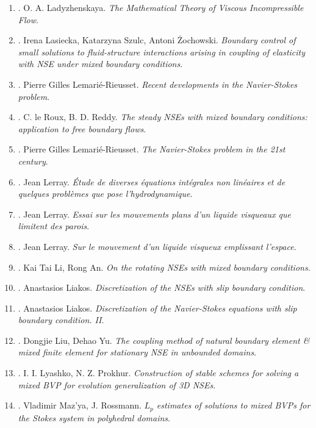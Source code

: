 \documentclass{article}
\begin{document}
\begin{enumerate}
	\item \cite{Ladyzhenskaya1969}. {\sc O. A. Ladyzhenskaya}. {\it The Mathematical Theory of Viscous Incompressible Flow}.
	\item \cite{Lasiecka_Szulc_Zochowski2018}. {\sc Irena Lasiecka, Katarzyna Szulc, Antoni \.{Z}ochowski}. {\it Boundary control of small solutions to fluid-structure interactions arising in coupling of elasticity with NSE under mixed boundary conditions}.
	\item \cite{Lemarie-Rieusset2002}. {\sc Pierre Gilles Lemari\'{e}-Rieusset}. {\it Recent developments in the Navier-Stokes problem}.
	\item \cite{le-Roux_Reddy1993}. {\sc C. le Roux, B. D. Reddy}. {\it The steady NSEs with mixed boundary conditions: application to free boundary flows}.
	\item \cite{Lemarie-Rieusset2016}. {\sc Pierre Gilles Lemari\'{e}-Rieusset}. {\it The Navier-Stokes problem in the 21st century}.
	\item \cite{Leray1933}. {\sc Jean Lerray}. {\it \'{E}tude de diverses \'{e}quations int\'{e}grales non lin\'{e}aires et de quelques probl\`emes que pose l'hydrodynamique}.
	\item \cite{Leray1934a}. {\sc Jean Lerray}. {\it Essai sur les mouvements plans d'un liquide visqueaux que limitent des parois}.
	\item \cite{Leray1934b}. {\sc Jean Lerray}. {\it Sur le mouvement d'un liquide visqueux emplissant l'espace}.
	\item \cite{Li_An2008}. {\sc Kai Tai Li, Rong An}. {\it On the rotating NSEs with mixed boundary conditions}.
	\item \cite{Liakos2001}. {\sc Anastasios Liakos}. {\it Discretization of the NSEs with slip boundary condition}.
	\item \cite{Liakos2004}. {\sc Anastasios Liakos}. {\it Discretization of the Navier-Stokes equations with slip boundary condition. II}.
	\item \cite{Liu_Yu2008}. {\sc Dongjie Liu, Dehao Yu}. {\it The coupling method of natural boundary element \& mixed finite element for stationary NSE in unbounded domains}.
	\item \cite{Lyashko_Prokhur1985}. {\sc I. I. Lyashko, N. Z. Prokhur}. {\it Construction of stable schemes for solving a mixed BVP for evolution generalization of 3D NSEs}.
	\item \cite{Mazya_Rossmann2007}. {\sc Vladimir Maz'ya, J. Rossmann}. {\it$L_p$ estimates of solutions to mixed BVPs for the Stokes system in polyhedral domains}.

\end{enumerate}
\end{document}
